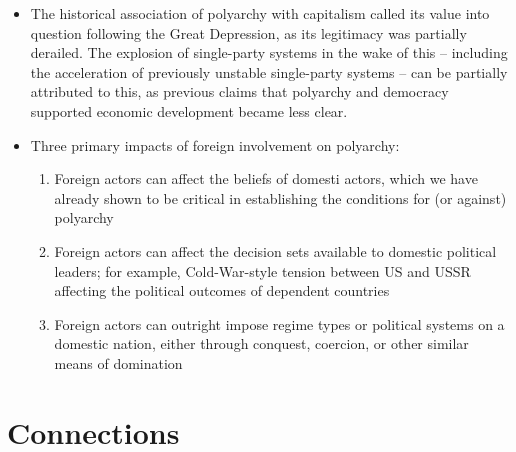 \documentclass[12pt]{article}
\begin{document}
\begin{itemize}[leftmargin=*, itemsep=4pt]
    \item The historical association of polyarchy with capitalism called its value into question following the Great Depression, as its legitimacy was partially derailed. The explosion of single-party systems in the wake of this -- including the acceleration of previously unstable single-party systems -- can be partially attributed to this, as previous claims that polyarchy and democracy supported economic development became less clear.
    \item Three primary impacts of foreign involvement on polyarchy:
    \begin{enumerate}
        \item Foreign actors can affect the beliefs of domesti actors, which we have already shown to be critical in establishing the conditions for (or against) polyarchy
        \item Foreign actors can affect the decision sets available to domestic political leaders; for example, Cold-War-style tension between US and USSR affecting the political outcomes of dependent countries
        \item Foreign actors can outright impose regime types or political systems on a domestic nation, either through conquest, coercion, or other similar means of domination
    \end{enumerate}
\end{itemize}


\section{Connections}
\end{document}
